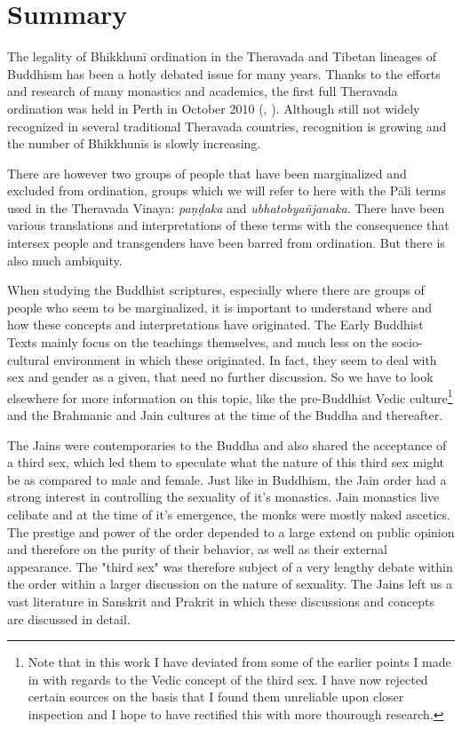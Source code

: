 \section{Summary}
The legality of Bhikkhunī ordination in the Theravada and Tibetan lineages of Buddhism has been a hotly debated issue for many years. Thanks to the efforts and research of many monastics and academics, the first full Theravada ordination was held in Perth in October 2010 (\cite{sujato2009}, \cite{analayo2013}). Although still not widely recognized in several traditional Theravada countries, recognition is growing and the number of Bhikkhunīs is slowly increasing. 

There are however two groups of people that have been marginalized and excluded from ordination, groups which we will refer to here with the Pāli terms used in the Theravada Vinaya: {\em paṇḍaka} and {\em ubhatob­yañ­janaka}. There have been various translations and interpretations of these terms with the consequence that intersex people and transgenders have been barred from ordination. But there is also much ambiquity.

When studying the Buddhist scriptures, especially where there are groups of people who seem to be marginalized, it is important to understand where and how these concepts and interpretations have originated. The Early Buddhist Texts mainly focus on the teachings themselves, and much less on the socio-cultural environment in which these originated. In fact, they seem to deal with sex and gender as a given, that need no further discussion. So we have to look elsewhere for more information on this topic, like the pre-Buddhist Vedic culture\footnote{Note that in this work I have deviated from some of the earlier points I made in \cite{vimala} with regards to the Vedic concept of the third sex. I have now rejected certain sources on the basis that I found them unreliable upon closer inspection and I hope to have rectified this with more thourough research.} and the Brahmanic and Jain cultures at the time of the Buddha and thereafter. 

The Jains were contemporaries to the Buddha and also shared the acceptance of a third sex, which led them to speculate what the nature of this third sex might be as compared to male and female. Just like in Buddhism, the Jain order had a strong interest in controlling the sexuality of it's monastics. Jain monastics live celibate and at the time of it's emergence, the monks were mostly naked ascetics. The prestige and power of the order depended to a large extend on public opinion and therefore on the purity of their behavior, as well as their external appearance. The "third sex" was therefore subject of a very lengthy debate within the order within a larger discussion on the nature of sexuality. The Jains left us a vast literature in Sanskrit and Prakrit in which these discussions and concepts are discussed in detail.